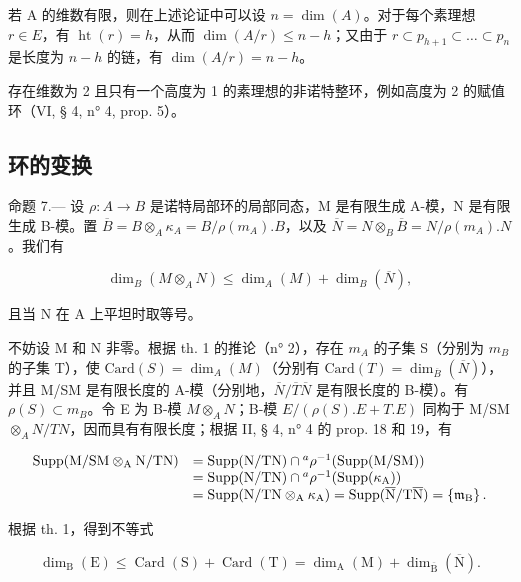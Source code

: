 若 A 的维数有限，则在上述论证中可以设 \(n = \dim(A)\)。对于每个素理想 \(r \in E\)，有 \(\operatorname{ht}(r) = h\)，从而 \(\dim(A/r) \leqslant n - h\)；又由于 \(r \subset p_{h+1} \subset \ldots \subset p_n\) 是长度为 \(n - h\) 的链，有 \(\dim(A/r) = n - h\)。

存在维数为 2 且只有一个高度为 1 的素理想的非诺特整环，例如高度为 2 的赋值环（VI, § 4, n° 4, prop. 5）。

\subsection{环的变换}

命题 7.--- 设 \(\rho: A \to B\) 是诺特局部环的局部同态，M 是有限生成 A-模，N 是有限生成 B-模。置 \(\overline{B} = B \otimes_A \kappa_A = B / \rho(m_A).B\)，以及 \(\overline{N} = N \otimes_B \overline{B} = N / \rho(m_A).N\)。我们有

\[
\dim_ {B} (M \otimes_ {A} N) \leqslant \dim_ {A} (M) + \dim_ {B} (\overline {{N}}),\tag{12}
\]

且当 N 在 A 上平坦时取等号。

不妨设 M 和 N 非零。根据 th. 1 的推论（n° 2），存在 \(m_A\) 的子集 S（分别为 \(m_B\) 的子集 T），使 \(\text{Card}(S) = \dim_A(M)\)（分别有 \(\text{Card}(T) = \dim_{\overline{B}}(\overline{N})\)），并且 M/SM 是有限长度的 A-模（分别地，\(\overline{N}/\overline{T}\overline{N}\) 是有限长度的 B-模）。有 \(\rho(S) \subset m_B\)。令 E 为 B-模 \(M \otimes_A N\)；B-模 \(E/(\rho(S).E + T.E)\) 同构于 M/SM \(\otimes_A N/TN\)，因而具有有限长度；根据 II, § 4, n° 4 的 prop. 18 和 19，有

\[
\begin{array}{r l} \operatorname{Supp} (\mathrm{M} / \mathrm{SM} \otimes_ {\mathrm{A}} \mathrm{N} / \mathrm{TN}) & = \operatorname{Supp} (\mathrm{N} / \mathrm{TN}) \cap {} ^ {a} \rho^ {- 1} (\operatorname{Supp} (\mathrm{M} / \mathrm{SM})) \\ & = \operatorname{Supp} (\mathrm{N} / \mathrm{TN}) \cap {} ^ {a} \rho^ {- 1} (\operatorname{Supp} (\kappa_ {\mathrm{A}})) \\ & = \operatorname{Supp} (\mathrm{N} / \mathrm{TN} \otimes_ {\mathrm{A}} \kappa_ {\mathrm{A}}) = \operatorname{Supp} (\overline {{\mathrm{N}}} / \mathrm{T} \overline {{\mathrm{N}}}) = \left\{\mathfrak {m} _ {\mathrm{B}} \right\}. \end{array}
\]

根据 th. 1，得到不等式

\[
\dim_ {\mathrm{B}} (\mathrm{E}) \leqslant \operatorname{Card} (\mathrm{S}) + \operatorname{Card} (\mathrm{T}) = \dim_ {\mathrm{A}} (\mathrm{M}) + \dim_ {\overline {{\mathrm{B}}}} (\overline {{\mathrm{N}}}).
\]

